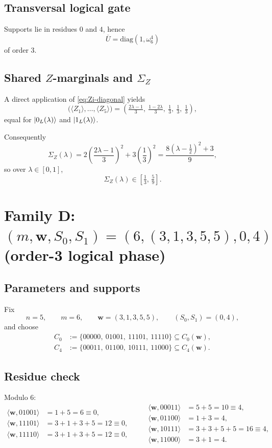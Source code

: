 \documentclass[11pt]{article}
\begin{document}
\subsection{Transversal logical gate}
Supports lie in residues $0$ and $4$, hence
\[
\overline U=\mathrm{diag}(1,\omega_6^{4})
\]
of order $3$.

\subsection{Shared $Z$-marginals and $\Sigma_Z$}
A direct application of \eqref{eq:Zi-diagonal} yields
\[
\boxed{
\bigl(\langle Z_1\rangle,\dots,\langle Z_5\rangle\bigr)
=
\left(\tfrac{2\lambda-1}{3},\ \tfrac{1-2\lambda}{3},\ \tfrac13,\ \tfrac13,\ \tfrac13\right),
}
\]
equal for $\ket{0_L(\lambda)}$ and $\ket{1_L(\lambda)}$.

Consequently
\[
\Sigma_Z(\lambda)=2\left(\frac{2\lambda-1}{3}\right)^2+3\left(\frac13\right)^2
=\frac{8\left(\lambda-\tfrac12\right)^2+3}{9},
\]
so over $\lambda\in[0,1]$,
\[
\boxed{\Sigma_Z(\lambda)\in\left[\tfrac13,\,\tfrac59\right].}
\]

\bigskip

\section{Family D: $(m,\mathbf w,S_0,S_1)=(6,(3,1,3,5,5),0,4)$ (order-3 logical phase)}

\subsection{Parameters and supports}
Fix
\[
n=5,\qquad m=6,\qquad \mathbf w=(3,1,3,5,5),\qquad (S_0,S_1)=(0,4),
\]
and choose
\[
\begin{aligned}
C_0&:=\{00000,\ 01001,\ 11101,\ 11110\}\subseteq C_0(\mathbf w),\\
C_4&:=\{00011,\ 01100,\ 10111,\ 11000\}\subseteq C_4(\mathbf w).
\end{aligned}
\]

\subsection{Residue check}
Modulo $6$:
\[
\begin{aligned}
\langle \mathbf w,01001\rangle&=1+5=6\equiv 0,\\
\langle \mathbf w,11101\rangle&=3+1+3+5=12\equiv 0,\\
\langle \mathbf w,11110\rangle&=3+1+3+5=12\equiv 0,
\end{aligned}
\qquad
\begin{aligned}
\langle \mathbf w,00011\rangle&=5+5=10\equiv 4,\\
\langle \mathbf w,01100\rangle&=1+3=4,\\
\langle \mathbf w,10111\rangle&=3+3+5+5=16\equiv 4,\\
\langle \mathbf w,11000\rangle&=3+1=4.
\end{aligned}
\]
\end{document}

